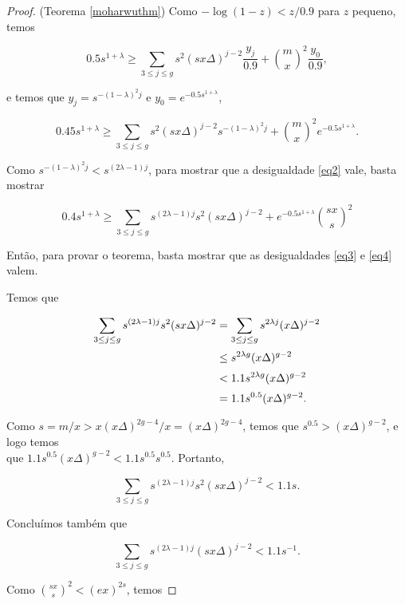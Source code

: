 \documentclass{article}
\begin{document}
\begin{proof}{(Teorema \ref{moharwuthm})}
Como $-\log(1-z) < z/0.9$ para $z$ pequeno, temos

\[0.5s^{1+\lambda} \geq \sum_{3\leq j \leq g} s^2(sx\Delta)^{j-2}\frac{y_j}{0.9} + \binom{m}{x}^2\frac{y_0}{0.9},\]

e temos que $y_j = s^{-(1-\lambda)^2j}$ e $y_0 = e^{-0.5s^{1+\lambda}}$, 

\[0.45s^{1+\lambda} \geq \sum_{3\leq j \leq g} s^2(sx\Delta)^{j-2} s^{-(1-\lambda)^2j} + \binom{m}{x}^2e^{-0.5s^{1+\lambda}}.\]

Como $s^{-(1-\lambda)^2j} < s^{(2\lambda - 1)j}$, para mostrar que a desigualdade \ref{eq2} vale, basta mostrar

\begin{equation}\label{eq4}
0.4s^{1+\lambda} \geq \sum_{3\leq j\leq g}s^{(2\lambda-1)j}s^2(sx\Delta)^{j-2}+e^{-0.5s^{1+\lambda}}\binom{sx}{s}^2
\end{equation}

Então, para provar o teorema, basta mostrar que as desigualdades \ref{eq3} e \ref{eq4} valem.

Temos que 

\begin{equation*}
\setlength{\jot}{5pt}
\begin{aligned}
\sum_{3\leq j\leq g}s^{(2\lambda-1)j}s^2(sx\Delta)^{j-2} & = \sum_{3\leq j\leq g}s^{2\lambda j}(x\Delta)^{j-2} \\
 & \leq s^{2\lambda g}(x\Delta)^{g-2} \\
 & < 1.1s^{2\lambda g}(x\Delta)^{g-2} \\
 & = 1.1s^{0.5}(x\Delta)^{g-2}.
\end{aligned}
\end{equation*}

Como $s = m/x > x(x\Delta)^{2g-4}/x = (x\Delta)^{2g-4}$, temos que $s^{0.5} > (x\Delta)^{g-2}$, e logo temos \\que $1.1s^{0.5}(x\Delta)^{g-2} < 1.1s^{0.5}s^{0.5}$. Portanto,

\begin{equation*}
\sum_{3\leq j\leq g}s^{(2\lambda-1)j}s^2(sx\Delta)^{j-2} < 1.1s.
\end{equation*}

Concluímos também que

\begin{equation*}
\sum_{3\leq j\leq g}s^{(2\lambda-1)j}(sx\Delta)^{j-2} < 1.1s^{-1}.
\end{equation*}

Como $\binom{sx}{s}^2 < (ex)^{2s}$, temos


\end{proof}
\end{document}
